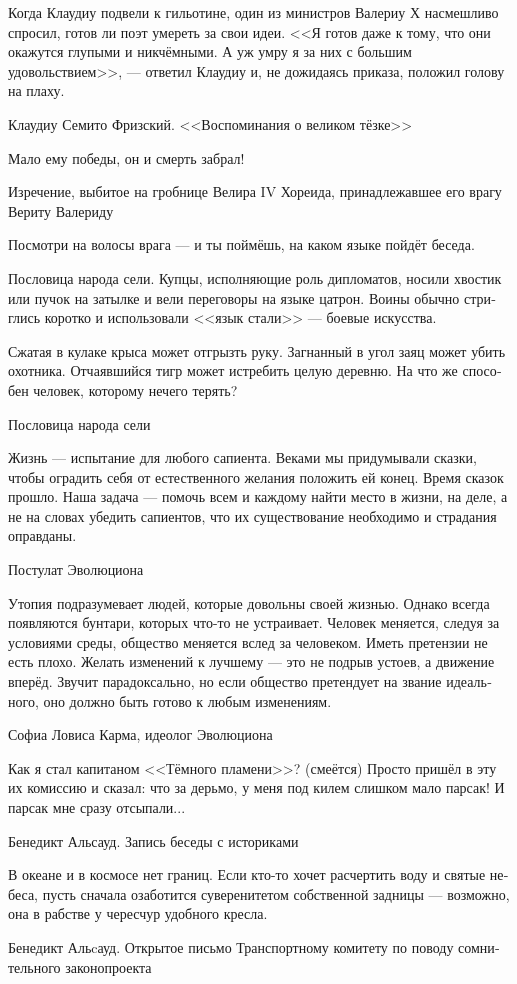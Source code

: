 \documentclass[a4paper,12pt,fleqn]{book}\usepackage{polyglossia}\setdefaultlanguage[babelshorthands=true]{russian}\setotherlanguage{english}\defaultfontfeatures{Ligatures=TeX,Mapping=tex-text}\usepackage{xcolor}\newcommand{\ml}[3]{#2}
\begin{document}
{\epigraph
{Когда Клаудиу подвели к гильотине, один из министров Валериу Х насмешливо спросил, готов ли поэт умереть за свои идеи.
<<Я готов даже к тому, что они окажутся глупыми и никчёмными.
А уж умру я за них с большим удовольствием>>, --- ответил Клаудиу и, не дожидаясь приказа, положил голову на плаху.}
{Клаудиу Семито Фризский. 
<<Воспоминания о великом тёзке>>}

\epigraph
{Мало ему победы, он и смерть забрал!}
{Изречение, выбитое на гробнице Велира IV Хореида, принадлежавшее его врагу Вериту Валериду}

\epigraph
{Посмотри на волосы врага --- и ты поймёшь, на каком языке пойдёт беседа.}
{Пословица народа сели.
Купцы, исполняющие роль дипломатов, носили хвостик или пучок на затылке и вели переговоры на языке цатрон.
Воины обычно стриглись коротко и использовали <<язык стали>> --- боевые искусства.}

\epigraph
{Сжатая в кулаке крыса может отгрызть руку.
Загнанный в угол заяц может убить охотника.
Отчаявшийся тигр может истребить целую деревню.
На что же способен человек, которому нечего терять?}
{Пословица народа сели}

\epigraph
{Жизнь --- испытание для любого сапиента.
Веками мы придумывали сказки, чтобы оградить себя от естественного желания положить ей конец.
Время сказок прошло.
Наша задача --- помочь всем и каждому найти место в жизни, на деле, а не на словах убедить сапиентов, что их существование необходимо и страдания оправданы.}
{Постулат Эволюциона}

\epigraph
{Утопия подразумевает людей, которые довольны своей жизнью.
Однако всегда появляются бунтари, которых что-то не устраивает.
Человек меняется, следуя за условиями среды, общество меняется вслед за человеком.
Иметь претензии не есть плохо.
Желать изменений к лучшему --- это не подрыв устоев, а движение вперёд.
Звучит парадоксально, но если общество претендует на звание идеального, оно должно быть готово к любым изменениям.}
{Софиа Ловиса Карма, идеолог Эволюциона}

\epigraph
{Как я стал капитаном <<Тёмного пламени>>?
(смеётся) Просто пришёл в эту их комиссию и сказал: что за дерьмо, у меня под килем слишком мало парсак!
И парсак мне сразу отсыпали...}
{Бенедикт Альсауд.
Запись беседы с историками}

\epigraph
{В океане и в космосе нет границ.
Если кто-то хочет расчертить воду и святые небеса, пусть сначала озаботится суверенитетом собственной задницы --- возможно, она в рабстве у чересчур удобного кресла.}
{Бенедикт Альcауд.
Открытое письмо Транспортному комитету по поводу сомнительного законопроекта}

}
\end{document}
